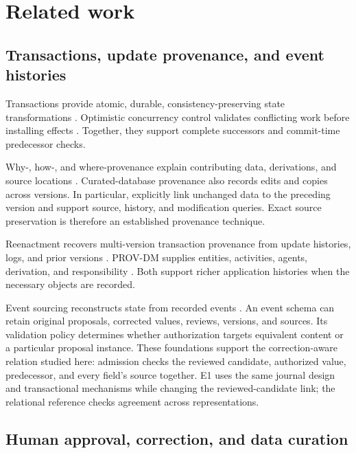 \section{Related work}
\label{sec:related}

\subsection{Transactions, update provenance, and event histories}

Transactions provide atomic, durable, consistency-preserving state transformations \citep{gray1981transaction}. Optimistic concurrency control validates conflicting work before installing effects \citep{kung1981occ}. Together, they support complete successors and commit-time predecessor checks.

Why-, how-, and where-provenance explain contributing data, derivations, and source locations \citep{buneman2001whywhere,cheney2009provenance}. Curated-database provenance also records edits and copies across versions. In particular, \citet{buneman2006curated} explicitly link unchanged data to the preceding version and support source, history, and modification queries. Exact source preservation is therefore an established provenance technique.

Reenactment recovers multi-version transaction provenance from update histories, logs, and prior versions \citep{arab2018reenactment}. PROV-DM supplies entities, activities, agents, derivation, and responsibility \citep{moreau2013provdm}. Both support richer application histories when the necessary objects are recorded.

Event sourcing reconstructs state from recorded events \citep{fowler2005eventsourcing}. An event schema can retain original proposals, corrected values, reviews, versions, and sources. Its validation policy determines whether authorization targets equivalent content or a particular proposal instance. These foundations support the correction-aware relation studied here: admission checks the reviewed candidate, authorized value, predecessor, and every field's source together. E1 uses the same journal design and transactional mechanisms while changing the reviewed-candidate link; the relational reference checks agreement across representations.

\subsection{Human approval, correction, and data curation}

